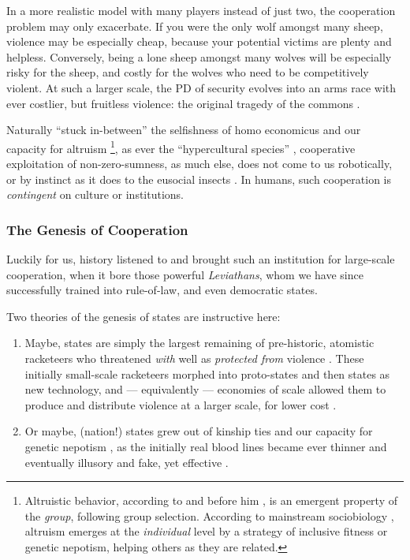 In a more realistic model with many players instead of just two, the cooperation problem may only exacerbate.
If you were the only wolf amongst many sheep, violence may be especially cheap, because your potential victims are plenty and helpless.
Conversely, being a lone sheep amongst many wolves will be especially risky for the sheep, and costly for the wolves who need to be competitively violent.
At such a larger scale, the \gls{PD} of security evolves into an arms race with ever costlier, but fruitless violence: the original tragedy of the commons \citep{Hardin-1968-aa}.

Naturally ``stuck in-between'' \citep{Lehrer2012} the selfishness of homo economicus and our capacity for altruism
\footnote{
	Altruistic behavior, according to \cite{Wilson2012} and before him \cite{Darwin1859}, is an emergent property of the \emph{group}, following group selection.
	According to mainstream sociobiology \citep[and initially][]{Wilson1975}, altruism emerges at the \emph{individual} level by a strategy of inclusive fitness or genetic nepotism, helping others as they are related.
},
as ever the ``hypercultural species'' \citep[K175]{Henrich2007}, cooperative exploitation of non-zero-sumness, as much else, does not come to us robotically, or by instinct as it does to the eusocial insects \citep{Wilson2012}.
In humans, such cooperation is \emph{contingent} on culture or institutions.

\subsubsection{The Genesis of Cooperation}
Luckily for us, history listened to \citeauthor{Hobbes-1651-aa} and brought such an institution for large-scale cooperation, when it bore those powerful \emph{Leviathans}, whom we have since successfully trained into rule-of-law, and even democratic states.

Two theories of the genesis of states are instructive here:
\begin{enumerate}
	\item
		Maybe, states are simply the largest remaining of pre-historic, atomistic racketeers who threatened \emph{with} well as \emph{protected from} violence \citep[182]{Tilly-1985-aa}.
		These initially small-scale racketeers morphed into proto-states and then states as new technology, and --- equivalently --- economies of scale allowed them to produce and distribute violence at a larger scale, for lower cost \citep{Tilly-1985-aa}.
	\item
		Or maybe, (nation!) states grew out of kinship ties and our capacity for genetic nepotism \citep{Hamilton1964,Axelrod1981a}, as the initially real blood lines became ever thinner and eventually illusory and fake, yet effective \citep{Van-den-Berghe-1981-aa,Gellner-1983-aa}.
\end{enumerate}

